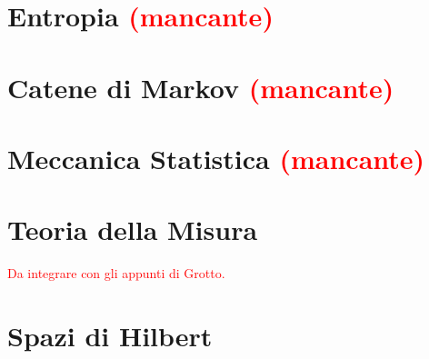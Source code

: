 \documentclass[a4paper, 11pt]{scrbook}
\theoremstyle{definition}
\theoremstyle{remark}
\theoremstyle{plain}
\numberwithin{equation}{chapter}
\begin{document}
\chapter{Entropia \textcolor{red}{(mancante)}}

\chapter{Catene di Markov \textcolor{red}{(mancante)}}

\chapter{Meccanica Statistica \textcolor{red}{(mancante)}}


\appendix
\chapter{Teoria della Misura}
\textcolor{red}{Da integrare con gli appunti di Grotto.}


\chapter{Spazi di Hilbert}


\backmatter


\nocite{stenberg}
\nocite{bs}
\nocite{ricci}
\nocite{khinchin}
\nocite{hw}
\nocite{shannon}
\nocite{norris}
\nocite{mm}
\end{document}
